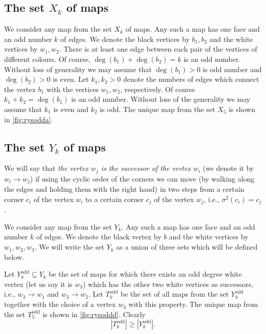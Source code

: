 \documentclass[submission]{FPSAC2021}
\DeclareMathOperator{\degg}{deg}
\DeclareMathOperator{\odd}{odd}
\newcommand{\nast}
{
	\sigma
}
\begin{document}
\subsection{The set $X_k$ of maps} 

We consider any map from the set $X_k$ of maps. Any such a
map has one face and an odd number $k$ of edges. We denote the black
vertices by $b_1, b_2$ and the white vertices by $w_1, w_2$. There is
at least one edge between each pair of the vertices of different colours.
Of course, $\degg(b_1)+\degg(b_2)=k$ is an odd number. Without loss of generality 
we may assume that $\degg(b_1)>0$ is odd number and $\degg(b_2)>0$ is even.
Let $k_1, k_2 > 0$ denote the numbers of edges which connect
the vertex $b_1$ with the vertices $w_1, w_2$, respectively. 
Of course $k_1+k_2=\degg(b_1)$ is an odd number. Without loss of the generality 
we may assume that $k_1$ is
even and $k_2$ is odd. The unique map from the
set $X_5$ is shown in \cref{fig:rysodda}.

\subsection{The set $Y_k$ of maps}

We will say that \emph{the vertex $w_j$ is the successor of the vertex
$w_i$} (we denote it by $w_i \rightarrow w_j$) 
if using the cyclic order of the corners we
can move (by walking along the edges and holding them with the right hand)
in two steps from a certain corner $c_i$ of the vertex $w_i$ to a certain
corner $c_j$ of the vertex $w_j$, i.e., $\nast^2(c_i)=c_j$. 

We consider any map from the set $Y_k$. Any such a map has one
face and an odd number $k$ of edges. We denote the black vertex by $b$
and  the white vertices by $w_1, w_2, w_3$. We will write the set $Y_k$ as
a union of three sets which will be defined below.

Let $Y_{k}^{\odd}\subseteq Y_k$ be the set of maps for which there exists an
odd degree white vertex (let us say it is $w_3$) which has the other two white vertices 
as successors, i.e., $w_3\rightarrow w_1$ and $w_3\rightarrow w_2$.
Let $T_k^{\odd}$ be the set of all maps from the set $Y_k^{\odd}$ 
together with the choice of a vertex $w_3$ with this property. 
The unique map from the set $T_{5}^{\odd}$ is shown in \cref{fig:rysoddd}. Clearly
\begin{equation}
\label{ineqodd}
|T_{k}^{\odd}| \geq |Y_{k}^{\odd}|.
\end{equation}
\end{document}
